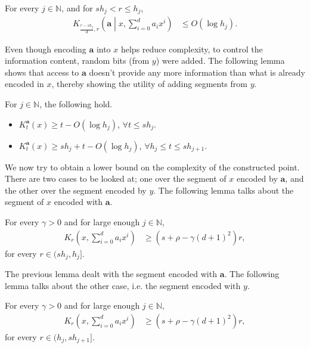 \documentclass[a4paper,UKenglish,cleveref,autoref,thm-restate]{lipics-v2021}
\begin{document}
\begin{lemma}\label{lem:lemma10}
	For every $j\in\mathbb{N}$, and for $sh_j<r\leq h_j$, 
	\begin{align*}
		K_{\frac{r-sh_j}{d},r}\left(\mathbf{a}\middle|x,\sum_{i=0}^{d}a_ix^i\right)&\leq O(\log h_j).
	\end{align*}
\end{lemma}
Even though encoding $\mathbf{a}$ into $x$ helps reduce complexity, to control the information content, random bits (from $y$) were added. The following lemma shows that access to $\mathbf{a}$ doesn't provide any more information than what is already encoded in $x$, thereby showing the utility of adding segments from $y$. 
\begin{lemma}\label{lem:lemma11}
	For $j\in\mathbb{N}$, the following hold. 
	\begin{itemize}
		\item $K_t^\mathbf{a}(x)\geq t-O(\log h_j)$, $\forall t\leq sh_j$.
		\item $K_t^\mathbf{a}(x)\geq sh_j+t-O(\log h_j)$, $\forall h_j\leq t\leq sh_{j+1}$.
	\end{itemize}
\end{lemma}
We now try to obtain a lower bound on the complexity of the constructed point. There are two cases to be looked at; one over the segment of $x$ encoded by $\mathbf{a}$, and the other over the segment encoded by $y$. The following lemma talks about the segment of $x$ encoded with $\mathbf{a}$. 
\begin{lemma}\label{lem:lessleft}
	For every $\gamma>0$ and for large enough $j\in\mathbb{N}$,
	\begin{align*}
		K_r\left(x,\sum_{i=0}^{d}a_ix^i\right)&\geq\left(s+\rho-\gamma(d+1)^2\right)r, 
	\end{align*}
	for every $r\in(sh_j,h_j]$.
\end{lemma}
The previous lemma dealt with the segment encoded with $\mathbf{a}$. The following lemma talks about the other case, i.e. the segment encoded with $y$. 
\begin{lemma}\label{lem:lessright}
	For every $\gamma>0$ and for large enough $j\in\mathbb{N}$,
	\begin{align*} 	K_r\left(x,\sum_{i=0}^{d}a_ix^i\right)&\geq\left(s+\rho-\gamma(d+1)^2\right)r,
	\end{align*}
	for every $r\in(h_j,sh_{j+1}]$.
\end{lemma}
\end{document}
